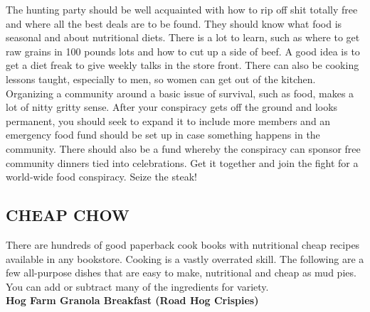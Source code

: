 \documentclass[11pt,twoside,a4paper]{book}
\begin{document}
The hunting party should be well acquainted with how to rip off shit totally free and where all the best deals are to be found. They should know what food is seasonal and about nutritional diets. There is a lot to learn, such as where to get raw grains in 100 pounds lots and how to cut up a side of beef. A good idea is to get a diet freak to give weekly talks in the store front. There can also be cooking lessons taught, especially to men, so women can get out of the kitchen.~\\

Organizing a community around a basic issue of survival, such as food, makes a lot of nitty gritty sense. After your conspiracy gets off the ground and looks permanent, you should seek to expand it to include more members and an emergency food fund should be set up in case something happens in the community. There should also be a fund whereby the conspiracy can sponsor free community dinners tied into celebrations. Get it together and join the fight for a world-wide food conspiracy. Seize the steak!~\\ 

\clearpage

\subsection{CHEAP CHOW}

There are hundreds of good paperback cook books with nutritional cheap recipes available in any bookstore. Cooking is a vastly overrated skill. The following are a few all-purpose dishes that are easy to make, nutritional and cheap as mud pies. You can add or subtract many of the ingredients for variety.~\\ 

\textbf{Hog Farm Granola Breakfast (Road Hog Crispies)}
\end{document}
